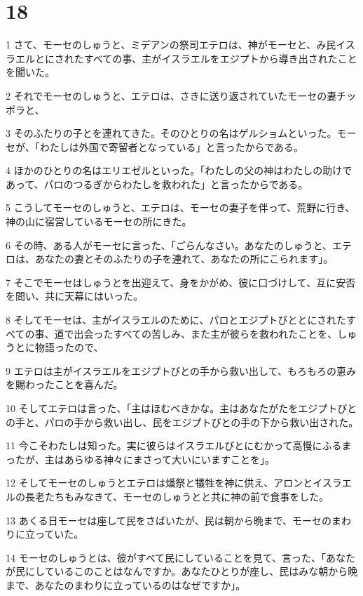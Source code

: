 \chapter{18}

\par 1 さて、モーセのしゅうと、ミデアンの祭司エテロは、神がモーセと、み民イスラエルとにされたすべての事、主がイスラエルをエジプトから導き出されたことを聞いた。
\par 2 それでモーセのしゅうと、エテロは、さきに送り返されていたモーセの妻チッポラと、
\par 3 そのふたりの子とを連れてきた。そのひとりの名はゲルショムといった。モーセが、「わたしは外国で寄留者となっている」と言ったからである。
\par 4 ほかのひとりの名はエリエゼルといった。「わたしの父の神はわたしの助けであって、パロのつるぎからわたしを救われた」と言ったからである。
\par 5 こうしてモーセのしゅうと、エテロは、モーセの妻子を伴って、荒野に行き、神の山に宿営しているモーセの所にきた。
\par 6 その時、ある人がモーセに言った、「ごらんなさい。あなたのしゅうと、エテロは、あなたの妻とそのふたりの子を連れて、あなたの所にこられます」。
\par 7 そこでモーセはしゅうとを出迎えて、身をかがめ、彼に口づけして、互に安否を問い、共に天幕にはいった。
\par 8 そしてモーセは、主がイスラエルのために、パロとエジプトびととにされたすべての事、道で出会ったすべての苦しみ、また主が彼らを救われたことを、しゅうとに物語ったので、
\par 9 エテロは主がイスラエルをエジプトびとの手から救い出して、もろもろの恵みを賜わったことを喜んだ。
\par 10 そしてエテロは言った、「主はほむべきかな。主はあなたがたをエジプトびとの手と、パロの手から救い出し、民をエジプトびとの手の下から救い出された。
\par 11 今こそわたしは知った。実に彼らはイスラエルびとにむかって高慢にふるまったが、主はあらゆる神々にまさって大いにいますことを」。
\par 12 そしてモーセのしゅうとエテロは燔祭と犠牲を神に供え、アロンとイスラエルの長老たちもみなきて、モーセのしゅうとと共に神の前で食事をした。
\par 13 あくる日モーセは座して民をさばいたが、民は朝から晩まで、モーセのまわりに立っていた。
\par 14 モーセのしゅうとは、彼がすべて民にしていることを見て、言った、「あなたが民にしているこのことはなんですか。あなたひとりが座し、民はみな朝から晩まで、あなたのまわりに立っているのはなぜですか」。

